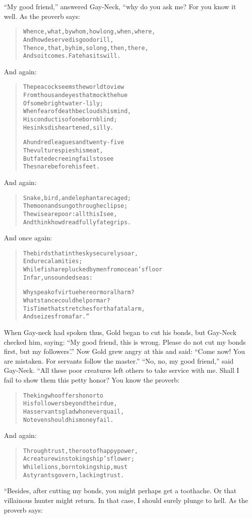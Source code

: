 \documentclass[article, twoside, 10pt]{memoir}
\renewenvironment{verbatim}{%
\begin{quote}%
\vskip -10pt%
\begin{alltt}\normalfont\small}{\end{alltt}%
\end{quote}%
\vskip -10pt
} %
\begin{document}
``My good friend,'' answered Gay-Neck, “why do you ask me? For you
know it well. As the proverb says:

\begin{verbatim}
Whence, what, by whom, how long, when, where,
    And how deserved is good or ill,
Thence, that, by him, so long, then, there,
    And so it comes. Fate has its will.
\end{verbatim}
And again:

\begin{verbatim}
The peacock seems the world to view
From thousand eyes that mock the hue
    Of some bright water-lily;
When fear of death beclouds his mind,
His conduct is of one born blind;
    He sinks disheartened, silly.

A hundred leagues and twenty-five
    The vulture spies his meat,
But{\textemdash}fate decreeing{\textemdash}fails to see
    The snare before his feet.
\end{verbatim}
And again:

\begin{verbatim}
Snake, bird, and elephant are caged;
    The moon and sun go through eclipse;
The wise are poor: all this I see,
    And think how dreadfully fate grips.
\end{verbatim}
And once again:

\begin{verbatim}
The birds that in the sky securely soar,
    Endure calamities;
While fish are plucked by men from ocean's floor
    In far, unsounded seas:

Why speak of virtue here or moral harm?
What stance could help or mar?
Tis Time that stretches forth a fatal arm,
And seizes from afar.”
\end{verbatim}
When Gay-neck had spoken thus, Gold began to cut his bonds, but
Gay-Neck checked him, saying:
``My good friend, this is wrong. Please do not cut my bonds first, but my followers'.''
Now Gold grew angry at this and said:
``Come now! You are mistaken. For servants follow the master.''
``No, no, my good friend,'' said Gay-Neck. “All these poor
creatures left others to take service with me. Shall I fail to show
them this petty honor? You know the proverb:

\begin{verbatim}
The king who offers honor to
His followers beyond their due,
Has servants glad who never quail,
Not even should his money fail.
\end{verbatim}
And again:

\begin{verbatim}
Through trust, the root of happy power,
A creature wins to kingship's flower;
While lions, born to kingship, must
As tyrants govern, lacking trust.
\end{verbatim}
“Besides, after cutting my bonds, you might perhaps get a
toothache. Or that villainous hunter might return. In that case, I
should surely plunge to hell. As the proverb says:
\end{document}
